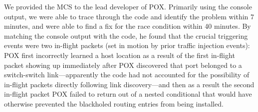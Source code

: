 We provided the MCS to the lead developer of POX. Primarily using the
console output, we were able to trace through the code and identify the problem
within 7 minutes, and were able to find a fix for the race condition within 40
minutes. By matching the console output with the code, he found that the crucial
triggering events were two
in-flight packets (set in motion by prior traffic injection events):
POX first incorrectly learned a host location as a result of the first in-flight
packet showing up immediately after POX discovered that port belonged to
a switch-switch link---apparently the code had not accounted for the
possibility of in-flight packets directly following link discovery---and
then as a result the
second in-flight packet
POX failed to return out of a nested conditional that would have
otherwise prevented the blackholed routing entries from being installed.\\[0.5ex]
